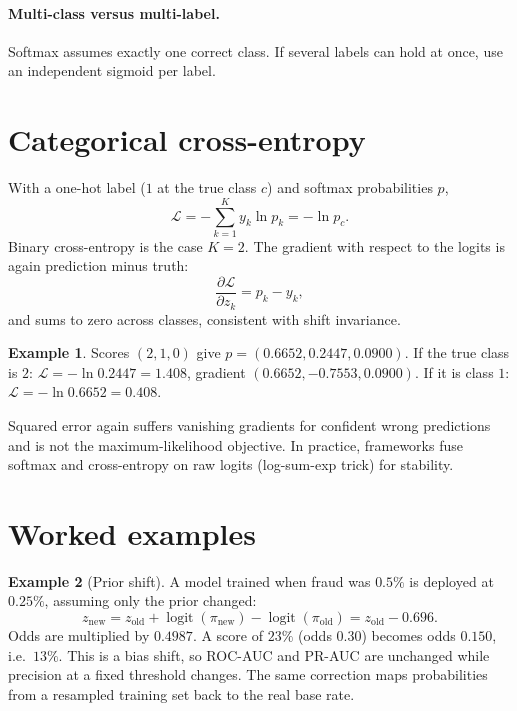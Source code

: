 \documentclass[11pt,a4paper]{article}
\DeclareMathOperator{\logit}{logit}
\theoremstyle{definition}
\newtheorem{example}{Example}
\begin{document}
\paragraph{Multi-class versus multi-label.} Softmax assumes exactly one correct class. If several labels can hold at once, use an independent sigmoid per label.

\section{Categorical cross-entropy}

With a one-hot label ($1$ at the true class $c$) and softmax probabilities $p$,
\[
\mathcal L=-\sum_{k=1}^{K}y_k\ln p_k=-\ln p_c .
\]
Binary cross-entropy is the case $K=2$. The gradient with respect to the logits is again prediction minus truth:
\[
\frac{\partial\mathcal L}{\partial z_k}=p_k-y_k,
\]
and sums to zero across classes, consistent with shift invariance.

\begin{example}
Scores $(2,1,0)$ give $p=(0.6652,0.2447,0.0900)$. If the true class is $2$: $\mathcal L=-\ln0.2447=1.408$, gradient $(0.6652,-0.7553,0.0900)$. If it is class $1$: $\mathcal L=-\ln0.6652=0.408$.
\end{example}

Squared error again suffers vanishing gradients for confident wrong predictions and is not the maximum-likelihood objective. In practice, frameworks fuse softmax and cross-entropy on raw logits (log-sum-exp trick) for stability.

\section{Worked examples}

\begin{example}[Prior shift]
A model trained when fraud was $0.5\%$ is deployed at $0.25\%$, assuming only the prior changed:
\[
z_{\text{new}}=z_{\text{old}}+\logit(\pi_{\text{new}})-\logit(\pi_{\text{old}})=z_{\text{old}}-0.696 .
\]
Odds are multiplied by $0.4987$. A score of $23\%$ (odds $0.30$) becomes odds $0.150$, i.e.\ $13\%$. This is a bias shift, so ROC-AUC and PR-AUC are unchanged while precision at a fixed threshold changes. The same correction maps probabilities from a resampled training set back to the real base rate.
\end{example}
\end{document}
